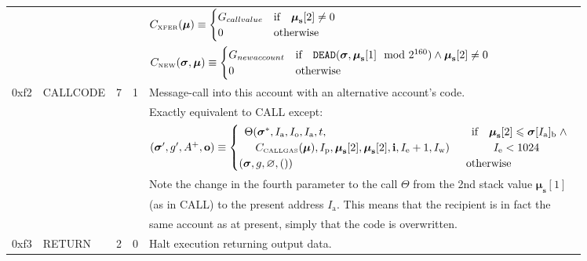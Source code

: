 \documentclass[9pt,oneside]{amsart}
\makeatletter
\newcommand{\linkdest}[1]{\Hy@raisedlink{\hypertarget{#1}{}}}
\makeatother
\begin{document}
\begin{tabular*}{\columnwidth}[h]{rlrrl}
&&&& $C_{\text{\tiny XFER}}(\boldsymbol{\mu}) \equiv \begin{cases}
G_{callvalue} & \text{if} \quad \boldsymbol{\mu}_{\mathbf{s}}[2] \neq 0 \\
0 & \text{otherwise}
\end{cases}$ \\
&&&& $C_{\text{\tiny NEW}}(\boldsymbol{\sigma}, \boldsymbol{\mu}) \equiv \begin{cases}
G_{newaccount} & \text{if} \quad \mathtt{\tiny DEAD}(\boldsymbol{\sigma}, \boldsymbol{\mu}_{\mathbf{s}}[1] \mod 2^{160}) \wedge \boldsymbol{\mu}_{\mathbf{s}}[2] \neq 0 \\
0 & \text{otherwise}
\end{cases}$ \\
\midrule
0xf2 & {\small CALLCODE} & 7 & 1 & Message-call into this account with an alternative account's code. \\
&&&& Exactly equivalent to {\small CALL} except: \\
&&&& $(\boldsymbol{\sigma}', g', A^+, \mathbf{o}) \equiv \begin{cases}\begin{array}{l}\Theta(\boldsymbol{\sigma}^*, I_{\mathrm{a}}, I_{\mathrm{o}}, I_{\mathrm{a}}, t,\\\quad C_{\text{\tiny CALLGAS}}(\boldsymbol{\mu}), I_{\mathrm{p}}, \boldsymbol{\mu}_{\mathbf{s}}[2], \boldsymbol{\mu}_{\mathbf{s}}[2], \mathbf{i}, I_{\mathrm{e}} + 1, I_{\mathrm{w}})\end{array} & \begin{array}{l}\text{if} \quad \boldsymbol{\mu}_{\mathbf{s}}[2] \leqslant \boldsymbol{\sigma}[I_{\mathrm{a}}]_{\mathrm{b}} \;\wedge\\ \quad\quad{}I_{\mathrm{e}} < 1024\end{array} \\ (\boldsymbol{\sigma}, g, \varnothing, ()) & \text{otherwise} \end{cases}$ \\
&&&& Note the change in the fourth parameter to the call $\Theta$ from the 2nd stack value $\boldsymbol{\mu}_{\mathbf{s}}[1]$\\
&&&& (as in {\small CALL}) to the present address $I_{\mathrm{a}}$. This means that the recipient is in fact the\\
&&&& same account as at present, simply that the code is overwritten.\\
\midrule
\linkdest{RETURN}{}0xf3 & {\small RETURN} & 2 & 0 & Halt execution returning output data. \\

\end{tabular*}
\end{document}
